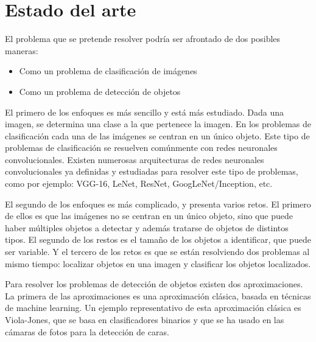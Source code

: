 \section{Estado del arte}


El problema que se pretende resolver podría ser afrontado de dos posibles maneras:

\begin{itemize}
	\item Como un problema de clasificación de imágenes
	\item Como un problema de detección de objetos
\end{itemize}

El primero de los enfoques es más sencillo y está más estudiado. Dada una imagen, se determina una clase a la que pertenece la imagen. En los problemas de clasificación cada una de las imágenes se centran en un único objeto. Este tipo de problemas de clasificación se resuelven comúnmente con redes neuronales convolucionales. Existen numerosas arquitecturas de redes neuronales convolucionales ya definidas y estudiadas para resolver este tipo de problemas, como por ejemplo: VGG-16, LeNet, ResNet, GoogLeNet/Inception, etc.

El segundo de los enfoques es más complicado, y presenta varios retos. El primero de ellos es que las imágenes no se centran en un único objeto, sino que puede haber múltiples objetos a detectar y además tratarse de objetos de distintos tipos. El segundo de los restos es el tamaño de los objetos a identificar, que puede ser variable. Y el tercero de los retos es que se están resolviendo dos problemas al mismo tiempo: localizar objetos en una imagen y clasificar los objetos localizados.

Para resolver los problemas de detección de objetos existen dos aproximaciones. La primera de las aproximaciones es una aproximación clásica, basada en técnicas de machine learning. Un ejemplo representativo de esta aproximación clásica es Viola-Jones, que se basa en clasificadores binarios y que se ha usado en las cámaras de fotos para la detección de caras.

